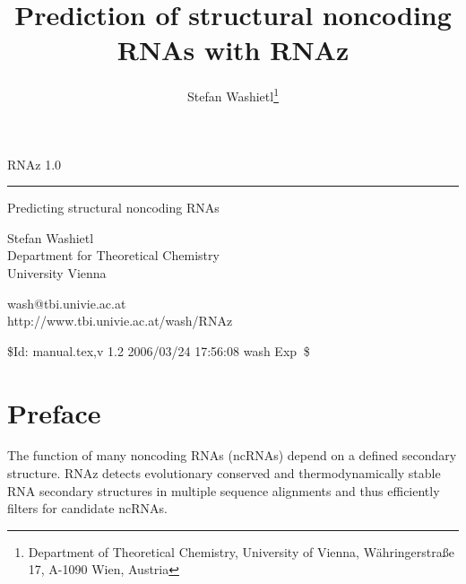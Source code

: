 \documentclass[11pt]{article}
\begin{document}
\title{Prediction of structural noncoding RNAs with RNAz} 
\author{Stefan Washietl\footnote{Department of Theoretical Chemistry, University of
  Vienna, W{\"a}hringerstra{\ss}e 17, A-1090 Wien, Austria}} 

\thispagestyle{empty}

\vspace*{5cm}

\huge 
\sf

RNAz 1.0

\vspace*{-0.8cm}
\rule{\textwidth}{1mm}

\large
\vspace*{-0.3cm}
\hfill Predicting structural noncoding RNAs

\vspace{3cm}

\vfill

Stefan Washietl\\Department for Theoretical
Chemistry\\University Vienna

wash@tbi.univie.ac.at\\
http://www.tbi.univie.ac.at/\raisebox{-0.9ex}{\~{ }}wash/RNAz

\normalfont

\newpage
\thispagestyle{empty}
\vspace*{0.9\textheight}

\begin{center}
  \$Id: manual.tex,v 1.2 2006/03/24 17:56:08 wash Exp $\ $\$
\end{center}


\newpage


\tableofcontents

\newpage


\section*{Preface}

The function of many noncoding RNAs (ncRNAs) depend on a defined secondary
structure. RNAz detects evolutionary conserved and thermodynamically stable
RNA secondary structures in multiple sequence alignments and thus
efficiently filters for candidate ncRNAs.
\end{document}
